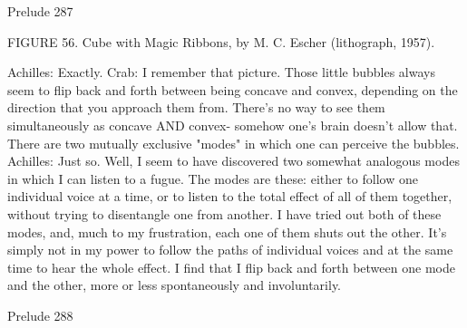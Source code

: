 Prelude                                                                                 287

      FIGURE 56. Cube with Magic Ribbons, by M. C. Escher (lithograph, 1957).

Achilles: Exactly.
Crab: I remember that picture. Those little bubbles always seem to flip back and forth
   between being concave and convex, depending on the direction that you approach
   them from. There's no way to see them simultaneously as concave AND convex-
   somehow one's brain doesn't allow that. There are two mutually exclusive "modes" in
   which one can perceive the bubbles.
Achilles: Just so. Well, I seem to have discovered two somewhat analogous modes in
   which I can listen to a fugue. The modes are these: either to follow one individual
   voice at a time, or to listen to the total effect of all of them together, without trying to
   disentangle one from another. I have tried out both of these modes, and, much to my
   frustration, each one of them shuts out the other. It's simply not in my power to follow
   the paths of individual voices and at the same time to hear the whole effect. I find that
   I flip back and forth between one mode and the other, more or less spontaneously and
   involuntarily.




Prelude                                                                                    288

